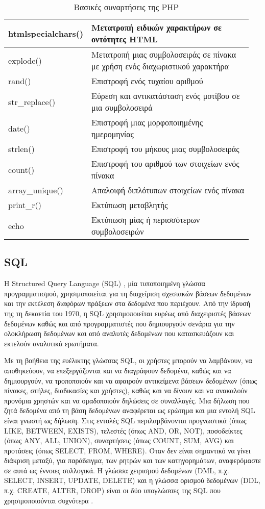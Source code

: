 \begin{table}[h]
	\caption{Βασικές συναρτήσεις της PHP}
	\label{tbl:php_basic_functions}
	\begin{tabular}{|p{0.2\linewidth}|p{0.75\linewidth}|}
		\hline
		htmlspecialchars() & Μετατροπή ειδικών χαρακτήρων σε οντότητες HTML \\ \hline
		explode() & Μετατροπή μιας συμβολοσειράς σε πίνακα με χρήση ενός διαχωριστικού χαρακτήρα \\ \hline
		rand() & Επιστροφή ενός τυχαίου αριθμού \\ \hline
		str\_replace() & Εύρεση και αντικατάσταση ενός μοτίβου σε μια συμβολοσειρά \\ \hline
		date() & Επιστροφή μιας μορφοποιημένης ημερομηνίας \\ \hline
		strlen() & Επιστροφή του μήκους μιας συμβολοσειράς \\ \hline
		count() & Επιστροφή του αριθμού των στοιχείων ενός πίνακα \\ \hline
		array\_unique() & Απαλοιφή διπλότυπων στοιχείων ενός πίνακα \\ \hline
		print\_r() & Εκτύπωση μεταβλητής \\ \hline
		echo & Εκτύπωση μίας ή περισσότερων συμβολοσειρών \\ \hline
	\end{tabular}
\end{table}

\subsection{SQL}
Η Structured Query Language (SQL) \cite{Loshin_2022}, μία τυποποιημένη γλώσσα προγραμματισμού, χρησιμοποιείται για τη διαχείριση σχεσιακών βάσεων δεδομένων και την εκτέλεση διαφόρων πράξεων στα δεδομένα που περιέχουν. Από την ίδρυσή της τη δεκαετία του 1970, η SQL χρησιμοποιείται ευρέως από διαχειριστές βάσεων δεδομένων καθώς και από προγραμματιστές που δημιουργούν σενάρια για την ολοκλήρωση δεδομένων και από αναλυτές δεδομένων που κατασκευάζουν και εκτελούν αναλυτικά ερωτήματα.

Με τη βοήθεια της ευέλικτης γλώσσας SQL, οι χρήστες μπορούν να λαμβάνουν, να αποθηκεύουν, να επεξεργάζονται και να διαγράφουν δεδομένα, καθώς και να δημιουργούν, να τροποποιούν και να αφαιρούν αντικείμενα βάσεων δεδομένων (όπως πίνακες, στήλες, διαδικασίες και χρήστες), καθώς και να δίνουν και να ανακαλούν προνόμια χρηστών και να ομαδοποιούν δηλώσεις σε συναλλαγές. Μια δήλωση που ζητά δεδομένα από τη βάση δεδομένων αναφέρεται ως ερώτημα και μια εντολή SQL είναι γνωστή ως δήλωση. Στις εντολές SQL περιλαμβάνονται προγνωστικά (όπως LIKE, BETWEEN, EXISTS), τελεστές (όπως AND, OR, NOT), ποσοδείκτες (όπως ANY, ALL, UNION), συναρτήσεις (όπως COUNT, SUM, AVG) και προτάσεις (όπως SELECT, FROM, WHERE). Όταν δεν είναι σημαντικό να γίνει διάκριση μεταξύ, για παράδειγμα, των ρητρών και των κατηγορημάτων, αναφερόμαστε σε αυτά ως έννοιες συλλογικά.
Η γλώσσα χειρισμού δεδομένων (DML, π.χ. SELECT, INSERT, UPDATE, DELETE) και η γλώσσα ορισμού δεδομένων (DDL, π.χ. CREATE, ALTER, DROP) είναι οι δύο υπογλώσσες της SQL που χρησιμοποιούνται συχνότερα \cite{taipalus2020sql}.
 
